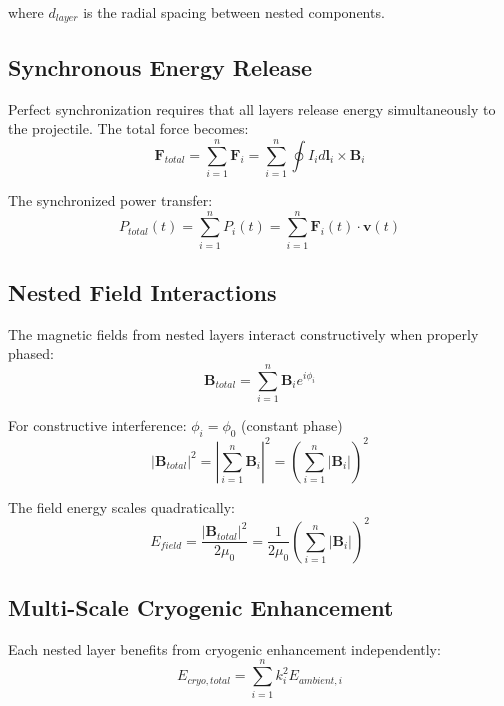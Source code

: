 \documentclass[12pt,a4paper]{article}
\begin{document}
where $d_{layer}$ is the radial spacing between nested components.

\subsection{Synchronous Energy Release}

Perfect synchronization requires that all layers release energy simultaneously to the projectile. The total force becomes:
\begin{equation}
\mathbf{F}_{total} = \sum_{i=1}^{n} \mathbf{F}_i = \sum_{i=1}^{n} \oint I_i d\mathbf{l}_i \times \mathbf{B}_i
\end{equation}

The synchronized power transfer:
\begin{equation}
P_{total}(t) = \sum_{i=1}^{n} P_i(t) = \sum_{i=1}^{n} \mathbf{F}_i(t) \cdot \mathbf{v}(t)
\end{equation}

\subsection{Nested Field Interactions}

The magnetic fields from nested layers interact constructively when properly phased:
\begin{equation}
\mathbf{B}_{total} = \sum_{i=1}^{n} \mathbf{B}_i e^{i\phi_i}
\end{equation}

For constructive interference: $\phi_i = \phi_0$ (constant phase)
\begin{equation}
|\mathbf{B}_{total}|^2 = \left|\sum_{i=1}^{n} \mathbf{B}_i\right|^2 = \left(\sum_{i=1}^{n} |\mathbf{B}_i|\right)^2
\end{equation}

The field energy scales quadratically:
\begin{equation}
E_{field} = \frac{|\mathbf{B}_{total}|^2}{2\mu_0} = \frac{1}{2\mu_0}\left(\sum_{i=1}^{n} |\mathbf{B}_i|\right)^2
\end{equation}

\subsection{Multi-Scale Cryogenic Enhancement}

Each nested layer benefits from cryogenic enhancement independently:
\begin{equation}
E_{cryo,total} = \sum_{i=1}^{n} k_i^2 E_{ambient,i}
\end{equation}
\end{document}
